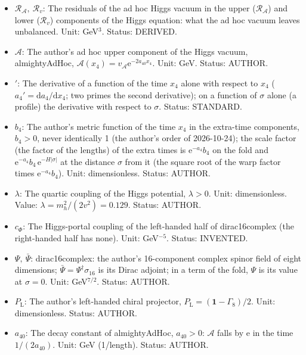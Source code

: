 \documentclass[
  10pt,
]{article}
\providecommand{\tightlist}{%
  \setlength{\itemsep}{0pt}\setlength{\parskip}{0pt}}
\begin{document}
\begin{itemize}
\tightlist
\item
  \(\mathcal{R}_{\mathcal{A}},\ \mathcal{R}_v\): The residuals of the ad
  hoc Higgs vacuum in the upper (\(\mathcal{R}_{\mathcal{A}}\)) and
  lower (\(\mathcal{R}_v\)) components of the Higgs equation: what the
  ad hoc vacuum leaves unbalanced. Unit: GeV\(^3\). Status: DERIVED.
\item
  \(\mathcal{A}\): The author's ad hoc upper component of the Higgs
  vacuum, almightyAdHoc,
  \(\mathcal{A}(x_4) = v_{\mathcal{A}}\mathrm{e}^{-2a_{40}x_4}\). Unit:
  GeV. Status: AUTHOR.
\item
  \({}'\): The derivative of a function of the time \(x_4\) alone with
  respect to \(x_4\) (\(a_4' = \mathrm{d}a_4/\mathrm{d}x_4\); two primes
  the second derivative); on a function of \(\sigma\) alone (a profile)
  the derivative with respect to \(\sigma\). Status: STANDARD.
\item
  \(b_4\): The author's metric function of the time \(x_4\) in the
  extra-time components, \(b_4 > 0\), never identically 1 (the author's
  order of 2026-10-24); the scale factor (the factor of the lengths) of
  the extra times is \(\mathrm{e}^{-a_4}b_4\) on the fold and
  \(\mathrm{e}^{-a_4}b_4\,\mathrm{e}^{-H\lvert\sigma\rvert}\) at the
  distance \(\sigma\) from it (the square root of the warp factor times
  \(\mathrm{e}^{-a_4}b_4\)). Unit: dimensionless. Status: AUTHOR.
\item
  \(\lambda\): The quartic coupling of the Higgs potential,
  \(\lambda > 0\). Unit: dimensionless. Value:
  \(\lambda = m_h^2/(2v^2) = 0.129\). Status: AUTHOR.
\item
  \(c_\Phi\): The Higgs-portal coupling of the left-handed half of
  dirac16complex (the right-handed half has none). Unit: GeV\(^{-5}\).
  Status: INVENTED.
\item
  \(\Psi,\ \bar\Psi\): dirac16complex: the author's 16-component complex
  spinor field of eight dimensions;
  \(\bar\Psi = \Psi^\dagger\sigma_{16}\) is its Dirac adjoint; in a term
  of the fold, \(\Psi\) is its value at \(\sigma = 0\). Unit:
  GeV\(^{7/2}\). Status: AUTHOR.
\item
  \(P_{\mathrm{L}}\): The author's left-handed chiral projector,
  \(P_{\mathrm{L}} = (\mathbf{1} - \Gamma_8)/2\). Unit: dimensionless.
  Status: AUTHOR.
\item
  \(a_{40}\): The decay constant of almightyAdHoc, \(a_{40} > 0\):
  \(\mathcal{A}\) falls by \(\mathrm{e}\) in the time \(1/(2a_{40})\).
  Unit: GeV (1/length). Status: AUTHOR.

\end{itemize}
\end{document}
